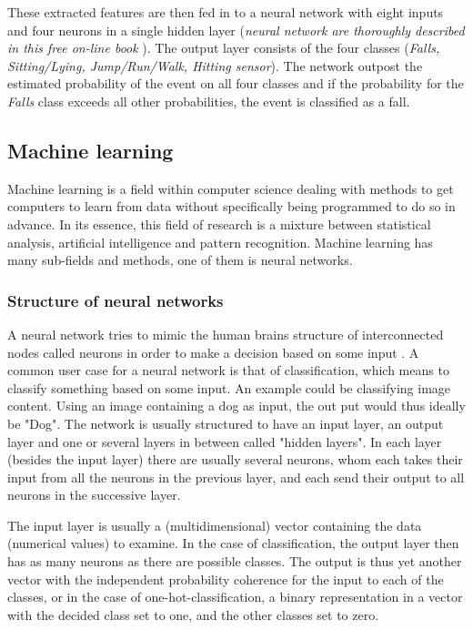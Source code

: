 \documentclass[12pt, a4paper, onecolumn]{article}
\begin{document}
	These extracted features are then fed in to a neural network with eight inputs and four neurons in a single hidden layer (\textit{neural network are thoroughly described in this free on-line book}  \cite{neural_networks}). The output layer consists of the four classes (\textit{Falls, Sitting/Lying, Jump/Run/Walk, Hitting sensor}). The network outpost the estimated probability of the event on all four classes and if the probability for the \textit{Falls}  class exceeds all other probabilities, the event is classified as a fall.
	
	\subsection{Machine learning}
	Machine learning is a field within computer science dealing with methods to get computers to learn from data without specifically being programmed to do so in advance. In its essence, this field of research is a mixture between statistical analysis, artificial intelligence and pattern recognition. Machine learning has many sub-fields and methods, one of them is neural networks. 
	
	\subsubsection{Structure of neural networks}
	A neural network tries to mimic the human brains structure of interconnected nodes called neurons in order to make a decision based on some input \cite{neural_networks}. A common user case for a neural network is that of classification, which means to classify something based on some input. An example could be classifying image content. Using an image containing a dog as input, the out put would thus ideally be "Dog". The network is usually structured to have an input layer, an output layer and one or several layers in between called "hidden layers". In each layer (besides the input layer) there are usually several neurons, whom each takes their input from all the neurons in the previous layer, and each send their output to all neurons in the successive layer. 
	
	The input layer is usually a (multidimensional) vector containing the data (numerical values) to examine. In the case of classification, the output layer then has as many neurons as there are possible classes. The output is thus yet another vector with the independent probability coherence for the input to each of the classes, or in the case of one-hot-classification, a binary representation in a vector with the decided class set to one, and the other classes set to zero. 
	
\end{document}
